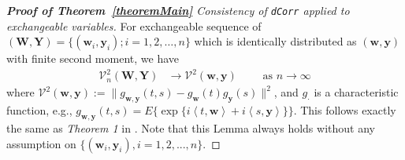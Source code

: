 \documentclass[11pt]{article}
\theoremstyle{definition}
\begin{document}
\begin{proof}[\textbf{Proof of Theorem~\ref{theoremMain}} Consistency of \texttt{dCorr} applied to exchangeable variables]
	\bigskip
	
	For exchangeable sequence of $(\mathbf{W}, \mathbf{Y}) = \{ (\mathbf{w}_{i}, \mathbf{y}_{i}) ; i = 1,2, \ldots, n \}$ which is identically distributed as $(\mathbf{w}, \mathbf{y})$ with finite second moment,  we have 
	\begin{eqnarray}
	\mathcal{V}_{n}^{2}(\mathbf{W},\mathbf{Y}) &\longrightarrow \mathcal{V}^{2}(\mathbf{w},\mathbf{y}) \quad \quad \mbox{ as } n \rightarrow \infty
	\label{eq:conv1}
	\end{eqnarray}
	where $\mathcal{V}^{2} (\mathbf{w},\mathbf{y}) := \| g_{\mathbf{w},\mathbf{y}}(t,s) - g_{\mathbf{w}}(t) g_{\mathbf{y}}(s) \|^2$, and $g_{\cdot}$ is a characteristic function, e.g., $g_{\mathbf{w},\mathbf{y}}(t,s) = E\{\exp\{i \left\langle t,\mathbf{w} \right\rangle  +i \left\langle  s,\mathbf{y}\right\rangle \}\}$. This follows exactly the same as \textit{Theorem 1} in \cite{szekely2007measuring}. Note that this Lemma always holds without any assumption on $\{(\mathbf{w}_{i},\mathbf{y}_{i}), i=1,2,...,n\}$.



\end{proof}
\end{document}
